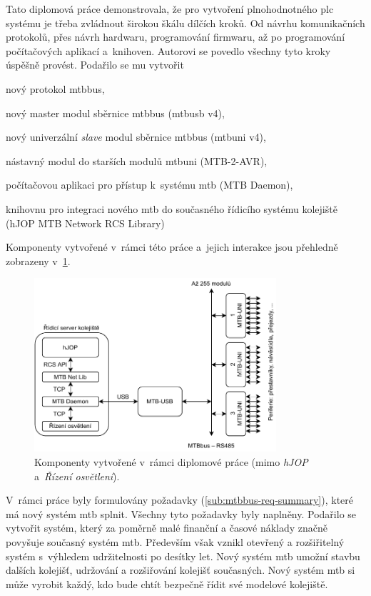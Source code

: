 Tato diplomová práce demonstrovala, že pro vytvoření plnohodnotného \gls{plc}
systému je třeba zvládnout širokou škálu dílčích kroků. Od návrhu komunikačních
protokolů, přes návrh hardwaru, programování firmwaru, až po programování
počítačových aplikací a~knihoven. Autorovi se povedlo všechny tyto kroky
úspěšně provést. Podařilo se mu vytvořit

\begin{compactitem}
\item nový protokol \gls{mtbbus},
\item nový master modul sběrnice \gls{mtbbus} (\gls{mtbusb} v4),
\item nový univerzální \textit{slave} modul sběrnice \gls{mtbbus} (\gls{mtbuni} v4),
\item nástavný modul do starších modulů \gls{mtbuni} (MTB-2-AVR),
\item počítačovou aplikaci pro přístup k~systému \gls{mtb} (MTB Daemon),
\item knihovnu pro integraci nového \gls{mtb} do současného řídicího systému
	kolejiště (hJOP MTB Network RCS Library)
\end{compactitem}

Komponenty vytvořené v~rámci této práce a~jejich interakce jsou přehledně
zobrazeny v~\ref{fig:new-topology}.

\begin{figure}[ht]
\includegraphics[width=0.8\textwidth]{data/new-topology.pdf}
\caption{Komponenty vytvořené v~rámci diplomové práce (mimo \textit{hJOP}
a~\textit{Řízení osvětlení}).}
\label{fig:new-topology}
\end{figure}

V~rámci práce byly formulovány požadavky (\ref{sub:mtbbus-req-summary}), které
má nový systém \gls{mtb} splnit. Všechny tyto požadavky byly naplněny.
Podařilo se vytvořit systém, který za poměrně malé finanční a časové náklady
značně povyšuje současný systém \gls{mtb}. Především však vznikl otevřený
a rozšiřitelný systém s~výhledem udržitelnosti po desítky let. Nový systém
\gls{mtb} umožní stavbu dalších kolejišť, udržování a rozšiřování kolejišť
současných. Nový systém \gls{mtb} si může vyrobit každý, kdo bude chtít bezpečně
řídit své modelové kolejiště.

